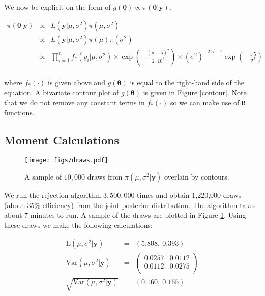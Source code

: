 \documentclass[12pt]{article}
\newcommand{\m}[1]{\mathbf{\bm{#1}}}
\begin{document}
\noindent We now be explicit on the form of $g(\m{\theta}) \propto \pi(\m{\theta}|\m{y})$.

\begin{eqnarray*}
\pi(\m{\theta}|\m{y}) &\propto& L(\m{y}|\mu, \sigma^2)\pi(\mu, \sigma^2) \\
&\propto& L(\m{y}|\mu, \sigma^2)\pi(\mu)\pi(\sigma^2) \\
&\propto& \prod_{i=1}^n f_*(y_i|\mu,\sigma^2)\times \exp\left(-\frac{(\mu-5)^2}{2\cdot10^2}\right) \times (\sigma^2)^{-2.5-1}\exp\left(-\frac{1.5}{\sigma^2}\right) \\ 
\end{eqnarray*}

\noindent where $f_*(\cdot)$ is given above and $g(\m{\theta})$ is equal to the right-hand side of the equation. A bivariate contour plot of $g(\m{\theta})$ is given in Figure \ref{contour}. Note that we do not remove any constant terms in $f_*(\cdot)$ so we can make use of \texttt{R} functions.

\subsection{Moment Calculations}

\begin{figure}
    \begin{center}
    \texttt{[image: figs/draws.pdf]}
    \end{center}
    \caption{A sample of $10,000$ draws from $\pi(\mu,\sigma^2|\m{y})$ overlain by contours.}
    \label{draws}
\end{figure}

\noindent We run the rejection algorithm $3,500,000$ times and obtain 1,220,000 draws (about 35\% efficiency) from the joint posterior distribution. The algorithm takes about 7 minutes to run. A sample of the draws are plotted in Figure \ref{draws}. Using these draws we make the following calculations:

\begin{eqnarray*}
\mathrm{E}(\mu,\sigma^2|\m{y}) &=& (5.808,~0.393) \\
\mathrm{Var}(\mu, \sigma^2|\m{y}) &=& \left(\begin{array}{ll} 0.0257 & 0.0112 \\ 0.0112 & 0.0275 \\ \end{array}\right) \\
\sqrt{\mathrm{Var}(\mu, \sigma^2|\m{y})} &=& (0.160,~0.165) \\
\end{eqnarray*}
\end{document}
